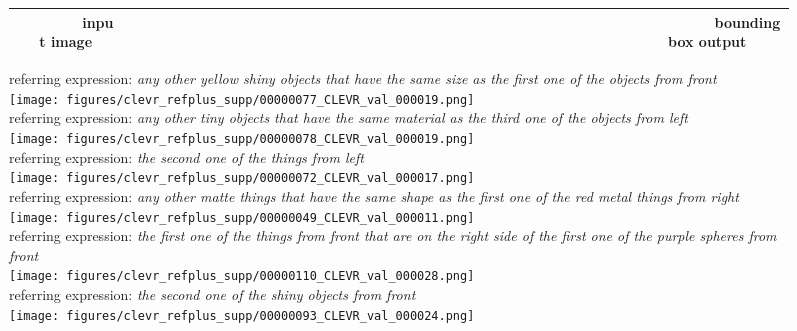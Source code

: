 \documentclass[10pt,twocolumn,letterpaper]{article}
\begin{document}
\begin{figure*}[t]
\centering
\small
\begin{tabularx}{\linewidth}{*{6}{c}}
~~~~~~~~input image & ~~~~~~~~~~~~~~~~~ & ~~~~~~~~~~~~~~~~~~~~~~~ & ~~~~~~~~~~~~~~~~~~~~~~ & ~~~~~~~~~~~~~~~~~~~~~~~ & ~~~~~~~~~~bounding box output \\
\hline
\end{tabularx}

\vspace{1mm}

referring expression: \textit{any other yellow shiny objects that have the same size as the first one of the objects from front} \\
\texttt{[image: figures/clevr\_refplus\_supp/00000077\_CLEVR\_val\_000019.png]} \\

referring expression: \textit{any other tiny objects that have the same material as the third one of the objects from left} \\
\texttt{[image: figures/clevr\_refplus\_supp/00000078\_CLEVR\_val\_000019.png]} \\

referring expression: \textit{the second one of the things from left} \\
\texttt{[image: figures/clevr\_refplus\_supp/00000072\_CLEVR\_val\_000017.png]} \\

referring expression: \textit{any other matte things that have the same shape as the first one of the red metal things from right} \\
\texttt{[image: figures/clevr\_refplus\_supp/00000049\_CLEVR\_val\_000011.png]} \\

referring expression: \textit{the first one of the things from front that are on the right side of the first one of the purple spheres from front} \\
\texttt{[image: figures/clevr\_refplus\_supp/00000110\_CLEVR\_val\_000028.png]} \\

referring expression: \textit{the second one of the shiny objects from front} \\
\texttt{[image: figures/clevr\_refplus\_supp/00000093\_CLEVR\_val\_000024.png]} \\


\end{figure*}
\end{document}
